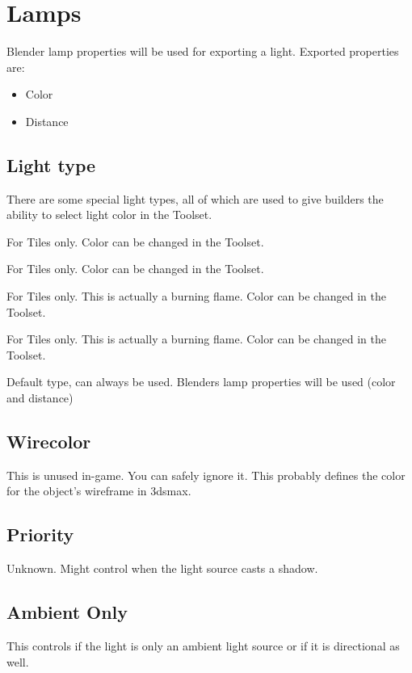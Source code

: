 \section{Lamps}
Blender lamp properties will be used for exporting a light.
Exported properties are:
\begin{itemize}
\item Color
\item Distance
\end{itemize}

\subsection*{Light type}
There are some special light types, all of which are used to give builders
the ability to select light color in the Toolset.
\begin{description}[leftmargin=8em,style=nextline]
    \item[Mainlight 1] For Tiles only. Color can be changed in the Toolset.
    \item[Mainlight 2] For Tiles only. Color can be changed in the Toolset.
    \item[Sourcelight 1] For Tiles only. This is actually a burning flame. Color can be changed in the Toolset.
    \item[Sourcelight 2] For Tiles only. This is actually a burning flame. Color can be changed in the Toolset.
    \item[Default] Default type, can always be used. Blenders lamp properties will be used (color and distance)
\end{description}

\subsection*{Wirecolor}
This is unused in-game. You can safely ignore it. This probably defines the
color for the object's wireframe in 3dsmax.

\subsection*{Priority}
Unknown. Might control when the light source casts a shadow.

\subsection*{Ambient Only}
This controls if the light is only an ambient light source or
if it is directional as well.

